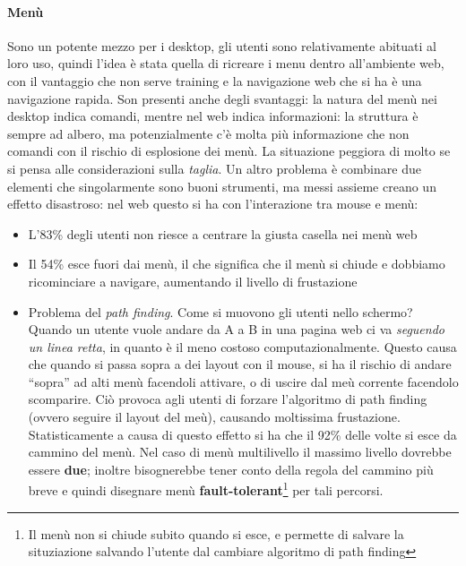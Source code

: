 \paragraph*{Men\`u} Sono un potente mezzo per i desktop, gli utenti sono relativamente abituati al loro uso, quindi l'idea \`e stata quella di ricreare i menu dentro all'ambiente web, con il vantaggio che non serve training e la navigazione web che si ha \`e una navigazione rapida. Son presenti anche degli svantaggi: la natura del men\`u nei desktop indica comandi, mentre nel web indica informazioni: la struttura \`e sempre ad albero, ma potenzialmente c'\`e molta pi\`u informazione che non comandi con il rischio di esplosione dei men\`u. La situazione peggiora di molto se si pensa alle considerazioni sulla \textit{taglia}. Un altro problema \`e combinare due elementi che singolarmente sono buoni strumenti, ma messi assieme creano un effetto disastroso: nel web questo si ha con l'interazione tra mouse e men\`u:
\begin{itemize}

\item L'83\% degli utenti non riesce a centrare la giusta casella nei men\`u web

\item Il 54\% esce fuori dai men\`u, il che significa che il men\`u si chiude e dobbiamo ricominciare a navigare, aumentando il livello di frustazione

\item Problema del \textit{path finding}. Come si muovono gli utenti nello schermo? Quando un utente vuole andare da A a B in una pagina web ci va \textit{seguendo un linea retta}, in quanto \`e il meno costoso computazionalmente. Questo causa che quando si passa sopra a dei layout con il mouse, si ha il rischio di andare ``sopra'' ad alti men\`u facendoli attivare, o di uscire dal me\`u corrente facendolo scomparire. Ci\`o provoca agli utenti di forzare l'algoritmo di path finding (ovvero seguire il layout del me\`u), causando moltissima frustazione. Statisticamente a causa di questo effetto si ha che il 92\% delle volte si esce da cammino del men\`u. Nel caso di men\`u multilivello il massimo livello dovrebbe essere \textbf{due}; inoltre bisognerebbe tener conto della regola del cammino pi\`u breve e quindi disegnare men\`u \textbf{fault-tolerant}\footnote{Il men\`u non si chiude subito quando si esce, e permette di salvare la situziazione salvando l'utente dal cambiare algoritmo di path finding} per tali percorsi.

\end{itemize}

